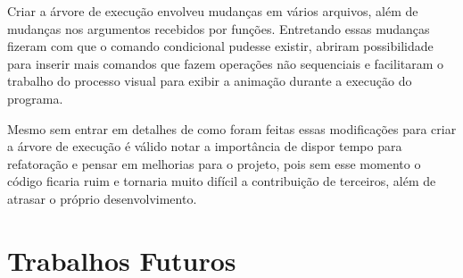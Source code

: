 Criar a árvore de execução envolveu mudanças em vários arquivos, além de 
mudanças nos argumentos recebidos por funções. Entretando essas mudanças 
fizeram com que o comando condicional pudesse existir, abriram possibilidade 
para inserir mais comandos que fazem operações não sequenciais e facilitaram o 
trabalho do processo visual para exibir a animação durante a execução do 
programa.

Mesmo sem entrar em detalhes de como foram feitas essas modificações para 
criar a árvore de execução é válido notar a importância de dispor tempo 
para refatoração e pensar em melhorias para o projeto, pois sem esse 
momento o código ficaria ruim e tornaria muito difícil a 
contribuição de terceiros, além de atrasar o próprio desenvolvimento.

\section{Trabalhos Futuros}

